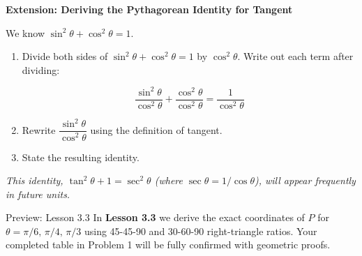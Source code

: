 \documentclass[10pt]{article}
\begin{document}
\begin{extensionbox}
\textbf{Extension: Deriving the Pythagorean Identity for Tangent}

We know $\sin^2\theta + \cos^2\theta = 1$.

\begin{enumerate}[leftmargin=1.8em, itemsep=4pt]
  \item Divide both sides of $\sin^2\theta + \cos^2\theta = 1$ by $\cos^2\theta$.
        Write out each term after dividing:

        \[
          \frac{\sin^2\theta}{\cos^2\theta} + \frac{\cos^2\theta}{\cos^2\theta}
          = \frac{1}{\cos^2\theta}
        \]

  \item Rewrite $\dfrac{\sin^2\theta}{\cos^2\theta}$ using the definition of tangent. \vspace{0.25in}

  \item State the resulting identity. \vspace{0.25in}
\end{enumerate}

\textit{This identity, $\tan^2\theta + 1 = \sec^2\theta$ (where $\sec\theta = 1/\cos\theta$),
will appear frequently in future units.}
\end{extensionbox}

\vspace{0.10in}

\begin{notesbox}{Preview: Lesson 3.3}
In \textbf{Lesson 3.3} we derive the exact coordinates of $P$ for
$\theta = \pi/6,\, \pi/4,\, \pi/3$ using 45-45-90 and 30-60-90 right-triangle ratios.
Your completed table in Problem 1 will be fully confirmed with geometric proofs.
\end{notesbox}
\end{document}
